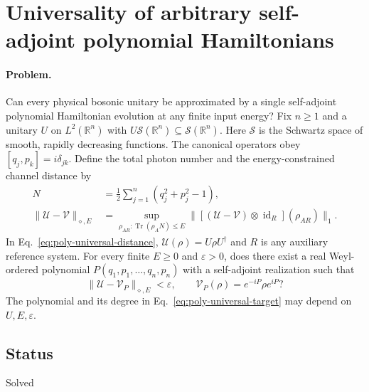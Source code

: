\section{Universality of arbitrary self-adjoint polynomial Hamiltonians}
\label{sec:op_5083d02a18761d8a}

\paragraph{Problem.}
Can every physical bosonic unitary be approximated by a single self-adjoint polynomial Hamiltonian evolution at any finite input energy?
Fix $n\geq1$ and a unitary $U$ on $L^2(\mathbb R^n)$ with $U\mathcal S(\mathbb R^n)\subseteq\mathcal S(\mathbb R^n)$.
Here $\mathcal S$ is the Schwartz space of smooth, rapidly decreasing functions.
The canonical operators obey $[q_j,p_k]=i\delta_{jk}$.
Define the total photon number and the energy-constrained channel distance by
\begin{equation}
 \begin{aligned}
 N&=\frac12\sum_{j=1}^n(q_j^2+p_j^2-1),\\
 \|\mathcal U-\mathcal V\|_{\diamond,E}
 &=\sup_{\rho_{AR}:\operatorname{Tr}(\rho_A N)\leq E}
 \|[(\mathcal U-\mathcal V)\otimes\operatorname{id}_R](\rho_{AR})\|_1 .
 \end{aligned}
 \label{eq:poly-universal-distance}
\end{equation}
In Eq.~\eqref{eq:poly-universal-distance}, $\mathcal U(\rho)=U\rho U^\dagger$ and $R$ is any auxiliary reference system.
For every finite $E\geq0$ and $\varepsilon>0$, does there exist a real Weyl-ordered polynomial $P(q_1,p_1,\ldots,q_n,p_n)$ with a self-adjoint realization such that
\begin{equation}
 \|\mathcal U-\mathcal V_P\|_{\diamond,E}<\varepsilon,
 \qquad
 \mathcal V_P(\rho)=e^{-iP}\rho e^{iP}?
 \label{eq:poly-universal-target}
\end{equation}
The polynomial and its degree in Eq.~\eqref{eq:poly-universal-target} may depend on $U,E,\varepsilon$.

\subsection*{Status}

Solved


